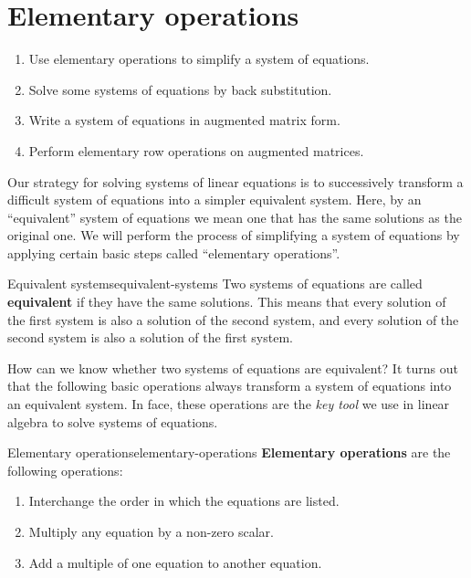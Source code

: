 \section{Elementary operations}

\begin{outcome}
  \begin{enumerate}
  \item Use elementary operations to simplify a system of equations.
  \item Solve some systems of equations by back substitution.
  \item Write a system of equations in augmented matrix form.
  \item Perform elementary row operations on augmented matrices.
  \end{enumerate}
\end{outcome}

Our strategy for solving systems of linear equations is to
successively transform a difficult system of equations into a simpler
equivalent system. Here, by an ``equivalent'' system of equations we
mean one that has the same solutions as the original one. We will
perform the process of simplifying a system of equations by applying
certain basic steps called ``elementary operations''.

\begin{definition}{Equivalent systems}{equivalent-systems}
  Two systems of equations are called
  \textbf{equivalent}
  if they have the same solutions. This means that every solution of
  the first system is also a solution of the second system, and every
  solution of the second system is also a solution of the first system.
\end{definition}

How can we know whether two systems of equations are equivalent? It
turns out that the following basic operations always transform a
system of equations into an equivalent system. In face, these
operations are the {\em key tool} we use in linear algebra to solve
systems of equations.

\begin{definition}{Elementary operations}{elementary-operations}
\textbf{Elementary operations} are the
following operations:

\begin{enumerate}
\item Interchange the order in which the equations are listed.

\item Multiply any equation by a non-zero scalar.

\item Add a multiple of one equation to another equation.
\end{enumerate}
\end{definition}

